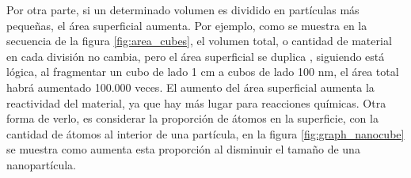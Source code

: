 Por otra parte, si un determinado volumen es dividido en partículas más pequeñas, el área superficial aumenta. Por ejemplo, como se muestra en la secuencia de la figura \ref{fig:area_cubes}, el volumen total, o cantidad de material en cada división no cambia, pero el área superficial se duplica \footnotemark, siguiendo está lógica, al fragmentar un cubo de lado 1 cm a cubos de lado 100 nm, el área total habrá aumentado 100.000 veces. El aumento del área superficial aumenta la reactividad del material, ya que hay más lugar para reacciones químicas. Otra forma de verlo, es considerar la proporción de átomos en la superficie, con la cantidad de átomos al interior de una partícula, en la figura \ref{fig:graph_nanocube} se muestra como aumenta esta proporción al disminuir el tamaño de una nanopartícula.


